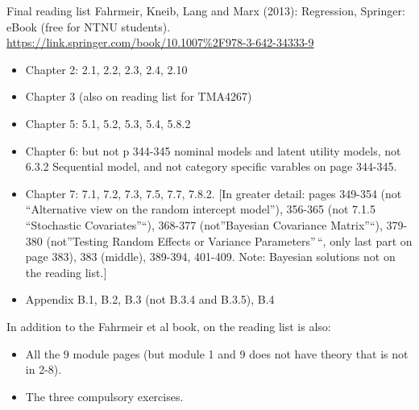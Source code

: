 \documentclass[
  ignorenonframetext,
]{beamer}
\providecommand{\tightlist}{%
  \setlength{\itemsep}{0pt}\setlength{\parskip}{0pt}}
\begin{document}
\begin{frame}
\begin{block}{Final reading list}
\protect\hypertarget{final-reading-list}{}
Fahrmeir, Kneib, Lang and Marx (2013): Regression, Springer: eBook (free
for NTNU students).
\url{https://link.springer.com/book/10.1007\%2F978-3-642-34333-9}

\begin{itemize}
\tightlist
\item
  Chapter 2: 2.1, 2.2, 2.3, 2.4, 2.10
\item
  Chapter 3 (also on reading list for TMA4267)
\item
  Chapter 5: 5.1, 5.2, 5.3, 5.4, 5.8.2
\item
  Chapter 6: but not p 344-345 nominal models and latent utility models,
  not 6.3.2 Sequential model, and not category specific varables on page
  344-345.
\item
  Chapter 7: 7.1, 7.2, 7.3, 7.5, 7.7, 7.8.2. \footnotesize {[}In greater
  detail: pages 349-354 (not ``Alternative view on the random intercept
  model''), 356-365 (not 7.1.5 ``Stochastic Covariates''``), 368-377
  (not''Bayesian Covariance Matrix''``), 379-380 (not''Testing Random
  Effects or Variance Parameters''\,``, only last part on page 383), 383
  (middle), 389-394, 401-409. Note: Bayesian solutions not on the
  reading list.{]} \normalsize
\item
  Appendix B.1, B.2, B.3 (not B.3.4 and B.3.5), B.4
\end{itemize}
\end{block}
\end{frame}

\begin{frame}
In addition to the Fahrmeir et al book, on the reading list is also:

\begin{itemize}
\tightlist
\item
  All the 9 module pages (but module 1 and 9 does not have theory that
  is not in 2-8).
\item
  The three compulsory exercises.
\end{itemize}
\end{frame}
\end{document}
